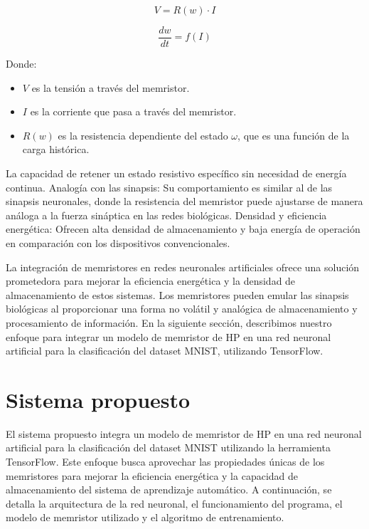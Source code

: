 \documentclass[conference]{IEEEtran}
\begin{document}
\begin{equation}
	V = R(w) \cdot I
	\label{eq:2}
\end{equation}

\begin{equation}
	\frac{dw}{dt} = f(I)
	\label{eq:3}
\end{equation}

Donde:
\begin{itemize}
	\item $V$ es la tensión a través del memristor.
	\item $I$ es la corriente que pasa a través del memristor.
	\item $R(w)$ es la resistencia dependiente del estado $\omega$, que es una función de la carga histórica.
\end{itemize}

La capacidad de retener un estado resistivo específico sin necesidad de energía continua.
Analogía con las sinapsis: Su comportamiento es similar al de las sinapsis neuronales, donde la resistencia del memristor puede ajustarse de manera análoga a la fuerza sináptica en las redes biológicas.
Densidad y eficiencia energética: Ofrecen alta densidad de almacenamiento y baja energía de operación en comparación con los dispositivos convencionales.

La integración de memristores en redes neuronales artificiales ofrece una solución prometedora para mejorar la eficiencia energética y la densidad de almacenamiento de estos sistemas. Los memristores pueden emular las sinapsis biológicas al proporcionar una forma no volátil y analógica de almacenamiento y procesamiento de información. En la siguiente sección, describimos nuestro enfoque para integrar un modelo de memristor de HP en una red neuronal artificial para la clasificación del dataset MNIST, utilizando TensorFlow.

\section{Sistema propuesto}

El sistema propuesto integra un modelo de memristor de HP en una red neuronal artificial para la clasificación del dataset MNIST utilizando la herramienta TensorFlow. Este enfoque busca aprovechar las propiedades únicas de los memristores para mejorar la eficiencia energética y la capacidad de almacenamiento del sistema de aprendizaje automático. A continuación, se detalla la arquitectura de la red neuronal, el funcionamiento del programa, el modelo de memristor utilizado y el algoritmo de entrenamiento.
\end{document}
